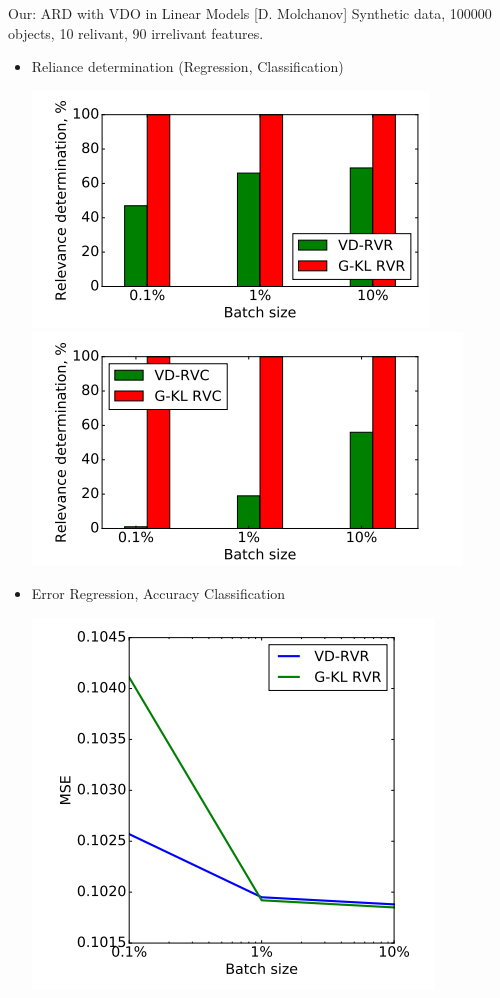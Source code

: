 \documentclass{beamer}
\begin{document}
\begin{frame}{Our: ARD with VDO in Linear Models {\scriptsize[D. Molchanov]}}
	Synthetic data, 100000 objects, 10 relivant, 90 irrelivant features.
	\begin{itemize}
		\item Reliance determination (Regression, Classification)
			\begin{center}
				\includegraphics[scale=0.3]{./img/rdc.png}
				\includegraphics[scale=0.3]{./img/rdr.png}
			\end{center}
		\item Error Regression, Accuracy Classification
					\begin{center}
						\includegraphics[scale=0.3]{./img/msec.png}

\end{center}
\end{itemize}
\end{frame}
\end{document}
